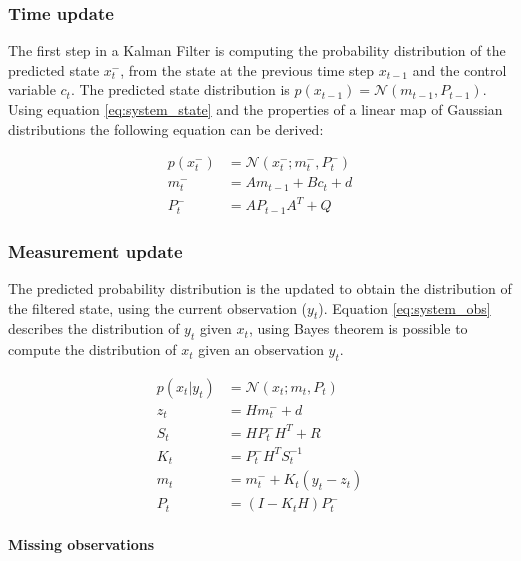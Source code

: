 \documentclass{article}
\newcommand{\norm}[3]{\mathcal{N}\left(#1; #2, #3\right)} %
\begin{document}
\subsubsection{Time update}

The first step in a Kalman Filter is computing the probability distribution of the predicted state $x^-_t$, from the state at the previous time step $x_{t-1}$ and the control variable $c_t$. The predicted state distribution is $p(x_{t-1}) = \mathcal{N}(m_{t-1}, P_{t-1})$.  Using equation \ref{eq:system_state} and the properties of a linear map of Gaussian distributions the following equation can be derived:

\begin{align}\label{eq:time_update}
    p(x^-_t) &= \norm{x_t^-}{m_t^-}{ P_t^-}\\
    m_t^- &= Am_{t-1} + B c_t + d \label{eq:time_update_mean}\\
    P_t^- &= AP_{t-1}A^T + Q \label{eq:time_update_cov}
\end{align} 

\pagebreak

\subsubsection{Measurement update}

The predicted probability distribution is the updated to obtain the distribution of the filtered state, using the current observation ($y_t$). Equation \ref{eq:system_obs} describes the distribution of $y_t$ given $x_t$, using Bayes theorem is possible to compute the distribution of $x_t$ given an observation $y_t$.

\begin{align}
 p(x_t|y_t) &= \mathcal{N}(x_t; m_t, P_t) \label{eq:meas_update}\\
 z_t &= Hm_t^- + d \label{eq:meas_update:obs_mean}\\
 S_t &= HP_t^-H^T + R \label{eq:meas_update:obs_cov}\\
 K_t &= P_t^-H^TS_t^{-1} \label{eq:meas_update:kalman_gain}\\
 m_t &= m_t^- + K_t(y_t - z_t) \label{eq:meas_update:state_mean}\\
 P_t &= (I-K_tH)P_t^- \label{eq:meas_update:state_cov}
\end{align}
    
\paragraph{Missing observations}
\end{document}
